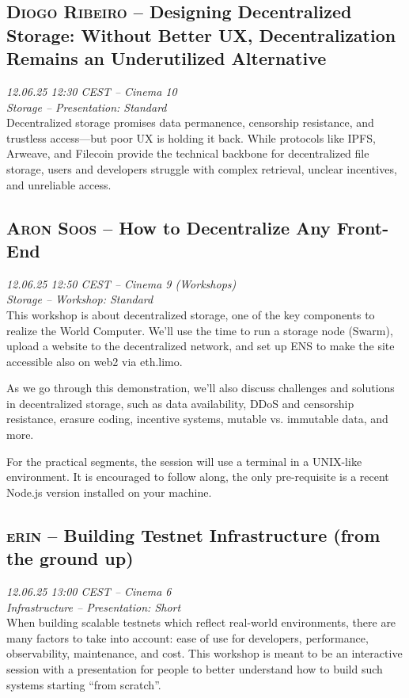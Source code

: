 \clearpage
\subsection {\textsc{Diogo Ribeiro}  -- Designing Decentralized Storage: Without Better UX, Decentralization Remains an Underutilized Alternative} \noindent \textit {12.06.25 12:30 CEST -- Cinema 10\\ Storage -- Presentation: Standard}\\[1em] Decentralized storage promises data permanence, censorship resistance, and trustless access—but poor UX is holding it back. While protocols like IPFS, Arweave, and Filecoin provide the technical backbone for decentralized file storage, users and developers struggle with complex retrieval, unclear incentives, and unreliable access.

\clearpage
\subsection {\textsc{Aron Soos}  -- How to Decentralize Any Front-End} \noindent \textit {12.06.25 12:50 CEST -- Cinema 9 (Workshops)\\ Storage -- Workshop: Standard}\\[1em] This workshop is about decentralized storage, one of the key components to realize the World Computer. We'll use the time to run a storage node (Swarm), upload a website to the decentralized network, and set up ENS to make the site accessible also on web2 via eth.limo.

As we go through this demonstration, we'll also discuss challenges and solutions in decentralized storage, such as data availability, DDoS and censorship resistance, erasure coding, incentive systems, mutable vs. immutable data, and more.

For the practical segments, the session will use a terminal in a UNIX-like environment. It is encouraged to follow along, the only pre-requisite is a recent Node.js version installed on your machine.

\clearpage
\subsection {\textsc{erin}  -- Building Testnet Infrastructure (from the ground up)} \noindent \textit {12.06.25 13:00 CEST -- Cinema 6\\ Infrastructure -- Presentation: Short}\\[1em] When building scalable testnets which reflect real-world environments, there are many factors to take into account: ease of use for developers, performance, observability, maintenance, and cost. This workshop is meant to be an interactive session with a presentation for people to better understand how to build such systems starting ``from scratch''.

